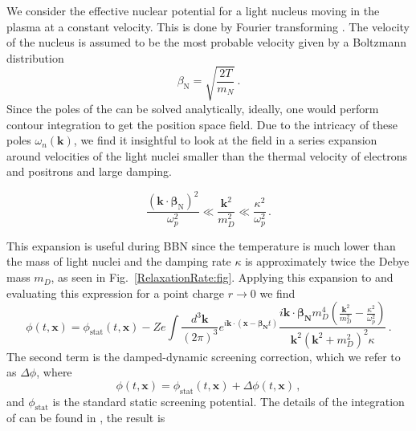\label{sec:DDS}
We consider the effective nuclear potential for a light nucleus moving in the plasma at a constant velocity. This is done by Fourier transforming . The velocity of the nucleus is assumed to be the most probable velocity given by a Boltzmann distribution
\begin{equation}\label{eq:vel}
 \beta_{\text{N}} = \sqrt{\frac{2T}{m_N}}\,. 
\end{equation}
Since the poles of the  can be solved analytically, ideally, one would perform contour integration to get the position space field. Due to the intricacy of these poles $\omega_n(\boldsymbol{k})$, we find it insightful to look at the field in a series expansion around velocities of the light nuclei smaller than the thermal velocity of electrons and positrons and large damping.

\begin{equation}\label{eq:expansion}
\frac{(\boldsymbol{k}\cdot\boldsymbol{\beta}_{\text{N}})^2}{\omega_p^2} \ll \frac{\boldsymbol{k}^2}{m_D^2} \ll \frac{\kappa^2}{\omega_p^2}\, .
\end{equation}

This expansion is useful during BBN since the temperature is much lower than the mass of light nuclei and the damping rate $\kappa$ is approximately twice the Debye mass $m_D$, as seen in Fig.~\ref{RelaxationRate:fig}. Applying this expansion to  and evaluating this expression for a point charge $r \rightarrow 0$ we find
\begin{equation}\label{eq:ddsint}
\phi(t,\boldsymbol{x}) =\phi_{\text{stat}}(t,\boldsymbol{x})-Ze\int \frac{d^3\boldsymbol{k}}{(2\pi)^3} e^{ i\boldsymbol{k}\cdot(\boldsymbol{x}-\boldsymbol{\beta_{\text{N}}} t)}\frac{i \boldsymbol{k}\cdot \boldsymbol{\beta_{\text{N}}} m_D^4 (\frac{\boldsymbol{k}^2}{m_D^2} - \frac{\kappa^2}{\omega_p^2})}{\boldsymbol{k}^2(\boldsymbol{k}^2+m_D^2)^2\kappa}\,.
\end{equation}
The second term is the damped-dynamic screening correction, which we refer to as $\Delta \phi$, where
\begin{equation}\label{eq:pos_point}
\phi(t,\boldsymbol{x}) = \phi_{\text{stat}}(t,\boldsymbol{x}) +\Delta \phi(t,\boldsymbol{x}) \,,
\end{equation}
and $\phi_{\text{stat}}$ is the standard static screening potential. The details of the integration of  can be found in \cite{Grayson:2023flr}, the result is

